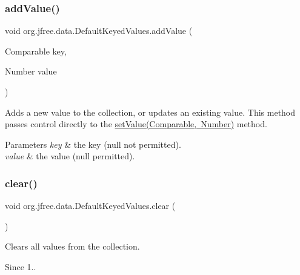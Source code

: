 \subsubsection{\texorpdfstring{add\+Value()}{addValue()}\hspace{0.1cm}{\footnotesize\ttfamily [2/2]}}
{\footnotesize\ttfamily void org.\+jfree.\+data.\+Default\+Keyed\+Values.\+add\+Value (\begin{DoxyParamCaption}\item[{Comparable}]{key,  }\item[{Number}]{value }\end{DoxyParamCaption})}

Adds a new value to the collection, or updates an existing value. This method passes control directly to the \mbox{\hyperlink{classorg_1_1jfree_1_1data_1_1_default_keyed_values_ab7f186e0cbc460c387f9e4ff505f99a0}{set\+Value(\+Comparable, Number)}} method.


\begin{DoxyParams}{Parameters}
{\em key} & the key ({\ttfamily null} not permitted). \\
\hline
{\em value} & the value ({\ttfamily null} permitted). \\
\hline
\end{DoxyParams}
\mbox{\label{classorg_1_1jfree_1_1data_1_1_default_keyed_values_a475fffdc4d0d06980fa755eb6c0f9c3a}} 
\subsubsection{\texorpdfstring{clear()}{clear()}}
{\footnotesize\ttfamily void org.\+jfree.\+data.\+Default\+Keyed\+Values.\+clear (\begin{DoxyParamCaption}{ }\end{DoxyParamCaption})}

Clears all values from the collection.

\begin{DoxySince}{Since}
1.. 
\end{DoxySince}
\mbox{\label{classorg_1_1jfree_1_1data_1_1_default_keyed_values_a1604f8c1fa18141fdd67ee2e59008248}} 

